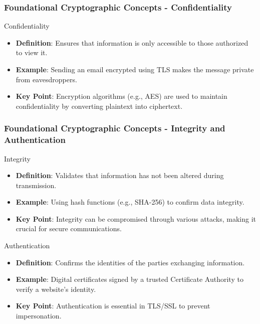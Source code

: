 \documentclass{beamer}
\begin{document}
\begin{frame}[fragile]
    \frametitle{Foundational Cryptographic Concepts - Confidentiality}
    \begin{block}{Confidentiality}
        \begin{itemize}
            \item \textbf{Definition}: Ensures that information is only accessible to those authorized to view it.
            \item \textbf{Example}: Sending an email encrypted using TLS makes the message private from eavesdroppers.
            \item \textbf{Key Point}: Encryption algorithms (e.g., AES) are used to maintain confidentiality by converting plaintext into ciphertext.
        \end{itemize}
    \end{block}
\end{frame}

\begin{frame}[fragile]
    \frametitle{Foundational Cryptographic Concepts - Integrity and Authentication}
    \begin{block}{Integrity}
        \begin{itemize}
            \item \textbf{Definition}: Validates that information has not been altered during transmission.
            \item \textbf{Example}: Using hash functions (e.g., SHA-256) to confirm data integrity.
            \item \textbf{Key Point}: Integrity can be compromised through various attacks, making it crucial for secure communications.
        \end{itemize}
    \end{block}

    \begin{block}{Authentication}
        \begin{itemize}
            \item \textbf{Definition}: Confirms the identities of the parties exchanging information.
            \item \textbf{Example}: Digital certificates signed by a trusted Certificate Authority to verify a website's identity.
            \item \textbf{Key Point}: Authentication is essential in TLS/SSL to prevent impersonation.
        \end{itemize}
    \end{block}
\end{frame}
\end{document}
